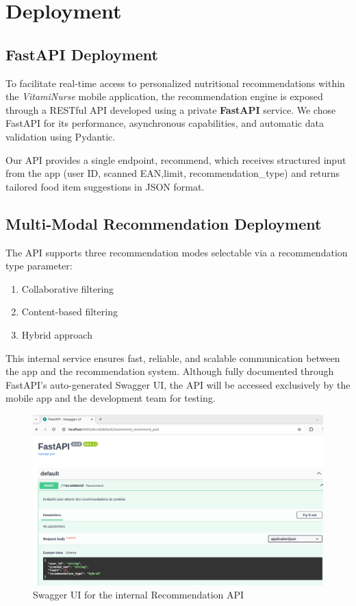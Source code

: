 \section{ Deployment}
\subsection{FastAPI Deployment}
To facilitate real-time access to personalized nutritional recommendations
within the \textit{VitamiNurse} mobile application, the recommendation engine
is exposed through a RESTful API developed using a private \textbf{FastAPI}
service. We chose FastAPI for its performance, asynchronous capabilities,
and automatic data validation using Pydantic.

Our API provides a single endpoint, \/recommend, which receives structured input from the app (user ID, scanned EAN,limit, recommendation\_type) and returns tailored food item suggestions in JSON format.

\subsection{ Multi-Modal Recommendation Deployment}
The API supports three recommendation modes selectable via a recommendation type parameter:
\begin{enumerate}
\item Collaborative filtering
\item Content-based filtering
\item  Hybrid approach
\end{enumerate}
This internal service ensures fast, reliable, and scalable communication
between the app and the recommendation system. Although fully documented through FastAPI’s auto-generated Swagger UI, the API will be
accessed exclusively by the mobile app and the development team for
testing.

\begin{figure}[H]
\centering
\includegraphics[scale=0.35]{images/swaggerFastAPI.png}
\caption{Swagger UI for the internal Recommendation API}
\label{fig:swagger_UI}
\end{figure}













